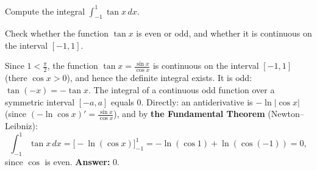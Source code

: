 
\begin{question}
Compute the integral $\displaystyle\int_{-1}^{1}\tan x\,dx$.
\end{question}

\begin{hint}
Check whether the function $\tan x$ is even or odd, and whether it is continuous on the interval $[-1,1]$.
\end{hint}

\begin{solution}
Since $1<\frac{\pi}{2}$, the function $\tan x=\frac{\sin x}{\cos x}$ is continuous on the interval $[-1,1]$ (there $\cos x>0$), and hence the definite integral exists. It is odd: $\tan(-x)=-\tan x$. The integral of a continuous odd function over a symmetric interval $[-a,a]$ equals $0$. Directly: an antiderivative is $-\ln|\cos x|$ (since $(-\ln\cos x)'=\frac{\sin x}{\cos x}$), and by \textbf{the Fundamental Theorem} (Newton--Leibniz):
\[ \int_{-1}^{1}\tan x\,dx=\Big[-\ln(\cos x)\Big]_{-1}^{1}=-\ln(\cos 1)+\ln(\cos(-1))=0, \]
since $\cos$ is even. \textbf{Answer:} $0$.
\end{solution}
